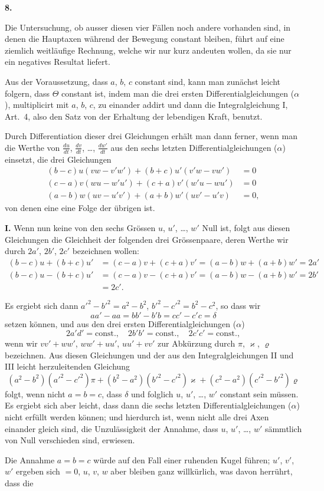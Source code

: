 \documentclass[12pt,a4paper]{article}
\begin{document}
\begin{center}
\textbf{8.}
\end{center}

Die Untersuchung, ob ausser diesen vier F\"allen noch andere vorhanden sind, in denen die Hauptaxen w\"ahrend der Bewegung constant bleiben, f\"uhrt auf eine ziemlich weitl\"aufige Rechnung, welche wir nur kurz andeuten wollen, da sie nur ein negatives Resultat liefert.

Aus der Voraussetzung, dass $a$, $b$, $c$ constant sind, kann man zun\"achst leicht folgern, dass $\Theta$ constant ist, indem man die drei ersten Differentialgleichungen ($\alpha$), multiplicirt mit $a$, $b$, $c$, zu einander addirt und dann die Integralgleichung I, Art.~4, also den Satz von der Erhaltung der lebendigen Kraft, benutzt.

Durch Differentiation dieser drei Gleichungen erh\"alt man dann ferner, wenn man die Werthe von $\frac{du}{dt}$, $\frac{dv}{dt}$, \dots, $\frac{dw'}{dt}$ aus den sechs letzten Differentialgleichungen ($\alpha$) einsetzt, die drei Gleichungen
\begin{align*}
(b - c)u(vw - v'w') + (b + c)u'(v'w - vw') &= 0\\
(c - a)v(wu - w'u') + (c + a)v'(w'u - wu') &= 0\\
(a - b)w(uv - u'v') + (a + b)w'(uv' - u'v) &= 0,\tag{1}
\end{align*}
von denen eine eine Folge der \"ubrigen ist.

\smallskip
\noindent\textbf{I.} Wenn nun keine von den sechs Gr\"ossen $u$, $u'$, \dots, $w'$ Null ist, folgt aus diesen Gleichungen die Gleichheit der folgenden drei Gr\"ossenpaare, deren Werthe wir durch $2a'$, $2b'$, $2c'$ bezeichnen wollen:
\begin{align*}
(b-c)u + (b+c)u' &= (c-a)v + (c+a)v' = (a-b)w + (a+b)w' = 2a'\\
(b-c)u - (b+c)u' &= (c-a)v - (c+a)v' = (a-b)w - (a+b)w' = 2b'\\
&= 2c'.\tag{2}
\end{align*}

Es ergiebt sich dann $a'^{2} - b'^{2} = a^{2} - b^{2}$, $b'^{2} - c'^{2} = b^{2} - c^{2}$, so dass wir
\[
aa' - aa = bb' - b'b = cc' - c'c = \delta
\]
setzen k\"onnen, und aus den drei ersten Differentialgleichungen ($\alpha$)
\[
2a'd' = \text{const.},\quad 2b'b' = \text{const.},\quad 2c'c' = \text{const.},
\]
wenn wir $vv' + ww'$, $ww' + uu'$, $uu' + vv'$ zur Abk\"urzung durch $\pi$, $\varkappa$, $\varrho$ bezeichnen. Aus diesen Gleichungen und der aus den Integralgleichungen II und III leicht herzuleitenden Gleichung
\[
(a^{2} - b^{2})(a'^{2} - c'^{2})\pi + (b^{2} - a^{2})(b'^{2} - c'^{2})\varkappa + (c^{2} - a^{2})(c'^{2} - b'^{2})\varrho
\]
folgt, wenn nicht $a = b = c$, dass $\delta$ und folglich $u$, $u'$, \dots, $w'$ constant sein m\"ussen. Es ergiebt sich aber leicht, dass dann die sechs letzten Differentialgleichungen ($\alpha$) nicht erf\"ullt werden k\"onnen; und hierdurch ist, wenn nicht alle drei Axen einander gleich sind, die Unzul\"assigkeit der Annahme, dass $u$, $u'$, \dots, $w'$ s\"ammtlich von Null verschieden sind, erwiesen.

Die Annahme $a = b = c$ w\"urde auf den Fall einer ruhenden Kugel f\"uhren; $u'$, $v'$, $w'$ ergeben sich $= 0$, $u$, $v$, $w$ aber bleiben ganz willk\"urlich, was davon herr\"uhrt, dass die
\end{document}
